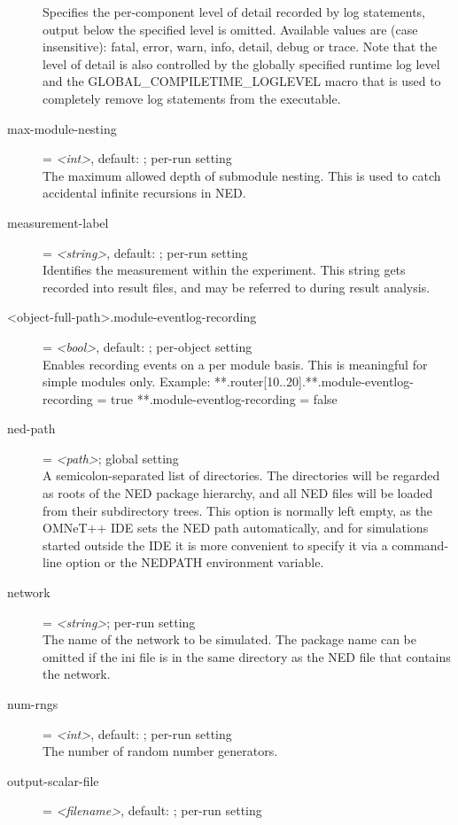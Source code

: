 \begin{description}
    Specifies the per-component level of detail recorded by log statements,
    output below the specified level is omitted. Available values are (case
    insensitive): fatal, error, warn, info, detail, debug or trace. Note that
    the level of detail is also controlled by the globally specified runtime
    log level and the GLOBAL\_COMPILETIME\_LOGLEVEL macro that is used to
    completely remove log statements from the executable.
\item[max-module-nesting] = \textit{<int>}, default: ; per-run setting \\
    The maximum allowed depth of submodule nesting. This is used to catch
    accidental infinite recursions in NED.
\item[measurement-label] = \textit{<string>}, default: ; per-run setting \\
    Identifies the measurement within the experiment. This string gets recorded
    into result files, and may be referred to during result analysis.
\item[<object-full-path>.module-eventlog-recording] = \textit{<bool>}, default: ; per-object setting \\
    Enables recording events on a per module basis. This is meaningful for
    simple modules only.
    Example:
     **.router[10..20].**.module-eventlog-recording = true
     **.module-eventlog-recording = false
\item[ned-path] = \textit{<path>}; global setting \\
    A semicolon-separated list of directories. The directories will be regarded
    as roots of the NED package hierarchy, and all NED files will be loaded
    from their subdirectory trees. This option is normally left empty, as the
    OMNeT++ IDE sets the NED path automatically, and for simulations started
    outside the IDE it is more convenient to specify it via a command-line
    option or the NEDPATH environment variable.
\item[network] = \textit{<string>}; per-run setting \\
    The name of the network to be simulated.  The package name can be omitted
    if the ini file is in the same directory as the NED file that contains the
    network.
\item[num-rngs] = \textit{<int>}, default: ; per-run setting \\
    The number of random number generators.
\item[output-scalar-file] = \textit{<filename>}, default: ; per-run setting \\

\end{description}
